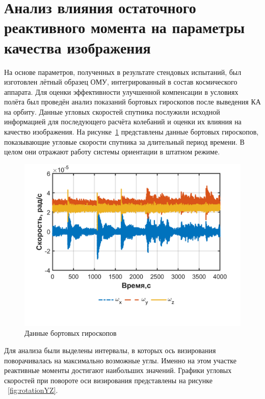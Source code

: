  \section{Анализ влияния остаточного реактивного момента на параметры качества изображения}
 
 На основе параметров, полученных в результате стендовых испытаний, был изготовлен лётный образец ОМУ, интегрированный в состав космического аппарата. Для оценки эффективности улучшенной компенсации в условиях полёта был проведён анализ показаний бортовых гироскопов после выведения КА на орбиту. Данные угловых скоростей спутника послужили исходной информацией для последующего расчёта колебаний и оценки их влияния на качество изображения. На рисунке~\cref{fig:sat_gyro_data} представлены данные бортовых гироскопов, показывающие угловые скорости спутника за длительный период времени. В целом они отражают работу системы ориентации в штатном режиме.
 
 \begin{figure}[h!]
 	\centering
 	\includegraphics[width=0.8\linewidth]{matlab/img/sat_gyro_data.png}
 	\caption{Данные бортовых гироскопов}
 	\label{fig:sat_gyro_data}
 \end{figure}
 
 Для анализа были выделены интервалы, в которых ось визирования поворачивалась на максимально возможные углы. Именно на этом участке реактивные моменты достигают наибольших значений. Графики угловых скоростей при повороте оси визирования представлены на рисунке ~\cref{fig:rotationYZ}.
 
